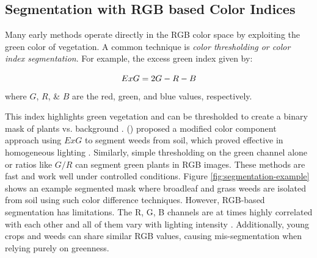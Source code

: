 \documentclass[letterpaper, notitlepage]{report}
\begin{document}
\subsection{Segmentation with RGB based Color Indices}  
Many early methods operate directly in the RGB color space by exploiting the green color of vegetation. A common technique is \textit{color thresholding or color index segmentation}. For example, the excess green index given by:

\begin{equation}\label{eqn:exg}
ExG = 2G - R - B \\
\end{equation}
 where $G$, $R$, \& $B$ are the red, green, and blue values, respectively.
 
 This index highlights green vegetation and can be thresholded to create a binary mask of plants vs. background \parencite{Wu2021-gt}. \citeauthor{Tang2000-an} (\citeyear{Tang2000-an}) proposed a modified color component approach using $ExG$ to segment weeds from soil, which proved effective in homogeneous lighting \parencite{Tang2000-an}. Similarly, simple thresholding on the green channel alone or ratios like $G/R$ can segment green plants in RGB images. These methods are fast and work well under controlled conditions. Figure \ref{fig:segmentation-example} shows an example segmented mask where broadleaf and grass weeds are isolated from soil using such color difference techniques. However, RGB-based segmentation has limitations. The R, G, B channels are at times highly correlated with each other and all of them vary with lighting intensity \parencite{Wu2021-gt}. Additionally, young crops and weeds can share similar RGB values, causing mis-segmentation when relying purely on greenness.
\end{document}
